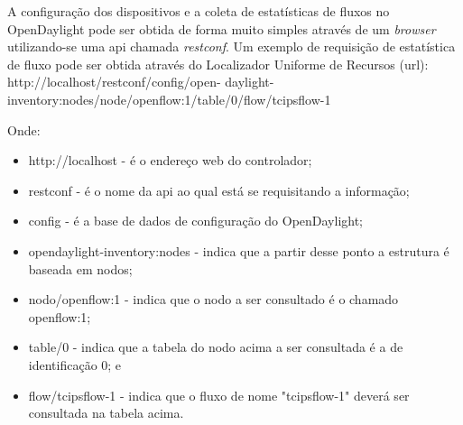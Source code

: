A configuração dos dispositivos e a coleta de estatísticas de fluxos no OpenDaylight pode ser obtida de forma muito simples através de um \textit{browser} utilizando-se uma \gls{api} chamada \textit{restconf}. Um exemplo de requisição de estatística de fluxo pode ser obtida através do Localizador Uniforme de Recursos (\gls{url}): http://localhost/restconf/config/open- daylight-inventory:nodes/node/openflow:1/table/0/flow/tcipsflow-1

Onde:
\begin{itemize}
    \item http://localhost - é o endereço \gls{web} do controlador;
    \item restconf - é o nome da \gls{api} ao qual está se requisitando a informação;
    \item config - é a base de dados de configuração do OpenDaylight;
    \item opendaylight-inventory:nodes - indica que a partir desse ponto a estrutura é baseada em nodos;
    \item nodo/openflow:1 - indica que o nodo a ser consultado é o chamado openflow:1;
    \item table/0 - indica que a tabela do nodo acima a ser consultada é a de identificação 0; e
    \item flow/tcipsflow-1 - indica que o fluxo de nome "tcipsflow-1" deverá ser consultada na tabela acima.
\end{itemize}

